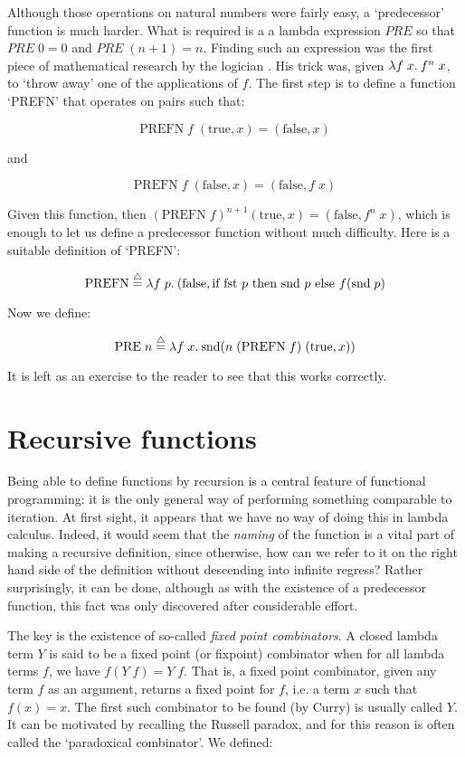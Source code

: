 Although those operations on natural numbers were fairly easy, a `predecessor'
function is much harder. What is required is a a lambda expression $PRE$ so
that $PRE\; 0 = 0$ and $PRE\; (n + 1) = n$. Finding such an expression was the
first piece of mathematical research by the logician .
His trick was, given $\lambda f\;x.\: f^n\; x$, to `throw away' one of the
applications of $f$. The first step is to define a function `PREFN' that
operates on pairs such that:

$$ \mbox{PREFN}\; f\; (\mbox{true},x) = (\mbox{false},x) $$

\noindent and

$$ \mbox{PREFN}\; f\; (\mbox{false},x) = (\mbox{false},f\; x) $$

Given this function, then $(\mbox{PREFN}\; f)^{n + 1} (\mbox{true},x) =
(\mbox{false},f^n\;x)$, which is enough to let us define a predecessor
function without much difficulty. Here is a suitable definition of `PREFN':

$$ \mbox{PREFN} \stackrel{\bigtriangleup}{=}
   \lambda f\; p.\: (\mbox{false},
      \mbox{if fst } p \mbox{ then snd } p \mbox{ else } f(\mbox{snd}\; p) $$

\noindent Now we define:

$$ \mbox{PRE}\; n \stackrel{\bigtriangleup}{=} \lambda f\; x.\:
       \mbox{snd} (n\; (\mbox{PREFN}\; f)\; (\mbox{true},x)) $$

\noindent It is left as an exercise to the reader to see that this works
correctly.

\section{Recursive functions}

Being able to define functions by recursion is a central feature of functional
programming: it is the only general way of performing something comparable to
iteration. At first sight, it appears that we have no way of doing this in
lambda calculus. Indeed, it would seem that the {\em naming} of the function is
a vital part of making a recursive definition, since otherwise, how can we
refer to it on the right hand side of the definition without descending into
infinite regress? Rather surprisingly, it can be done, although as with the
existence of a predecessor function, this fact was only discovered after
considerable effort.

The key is the existence of so-called {\em fixed point combinators}. A closed
lambda term $Y$ is said to be a fixed point (or fixpoint) combinator when for
all lambda terms $f$, we have $f(Y\; f) = Y\; f$. That is, a fixed point
combinator, given any term $f$ as an argument, returns a fixed point for $f$,
i.e. a term $x$ such that $f(x) = x$. The first such combinator to be found (by
Curry) is usually called $Y$. It can be motivated by recalling the Russell
paradox, and for this reason is often called the `paradoxical combinator'. We
defined:

